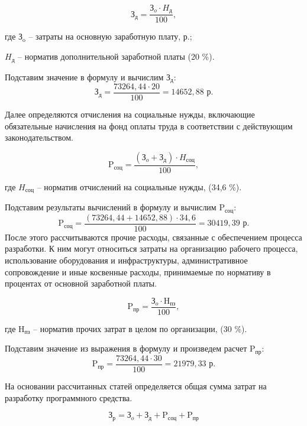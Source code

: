 \begin{equation}
    \text{З}_{\text{д}} = \frac{\text{З}_{o}\cdot H_\text{д}}{100},
\end{equation}

где $\text{З}_{\text{o}}$ -- затраты на основную заработную плату, р.;

    $H_\text{д}$ -- норматив дополнительной заработной платы (20 \%).

Подставим значение в формулу и вычислим $\text{З}_{\text{д}}$:
$$
\text{З}_{\text{д}} = \frac{73264{,}44 \cdot 20}{100} = 14652{,}88 \text{ р}.
$$

Далее определяются отчисления на социальные нужды, включающие обязательные начисления на фонд оплаты труда в соответствии с действующим законодательством.

\begin{equation}
    \text{P}_{\text{соц}} = \frac{(\text{З}_{o} + \text{З}_{\text{д}})\cdot H_\text{соц}}{100},
\end{equation}

где $H_\text{соц}$ -- норматив отчислений на социальные нужды, (34,6 \%).

Подставим результаты вычислений в формулу и вычислим $\text{P}_{\text{соц}}$:
$$
 \text{P}_{\text{соц}} = \frac{(73264{,}44 + 14652{,}88)\cdot 34{,}6}{100} = 30419{,}39 \text{ р}.
$$
После этого рассчитываются прочие расходы, связанные с обеспечением процесса разработки. К ним могут относиться затраты на организацию рабочего процесса, использование оборудования и инфраструктуры, административное сопровождение и иные косвенные расходы, принимаемые по нормативу в процентах от основной заработной платы.

\begin{equation}
    \text{P}_{\text{пр}} = \frac{\text{З}_{o} \cdot \text{H}_{\text{пз}}}{100},
\end{equation}

где $\text{H}_{\text{пз}}$ -- норматив прочих затрат в целом по организации, (30 \%).

Подставим значение из выражения в формулу и произведем расчет $\text{P}_{\text{пр}}$:
$$
 \text{P}_{\text{пр}} = \frac{73264{,}44 \cdot 30}{100} = 21979{,}33 \text{ р}.
$$

На основании рассчитанных статей определяется общая сумма затрат на разработку программного средства.

\begin{equation}
    \text{З}_{\text{р}} = \text{З}_{o} + \text{З}_{\text{д}} + \text{P}_{\text{соц}} + \text{P}_{\text{пр}}
\end{equation}

